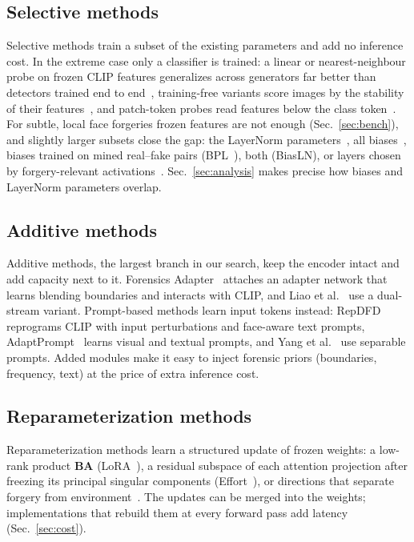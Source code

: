 \documentclass[fonts]{icst}
\begin{document}
\subsection{Selective methods}
Selective methods train a subset of the existing parameters and add no inference cost. In the extreme case only a classifier is trained: a linear or nearest-neighbour probe on frozen CLIP features generalizes across generators far better than detectors trained end to end~\cite{ojha2023universal}, training-free variants score images by the stability of their features~\cite{tsai2024trainingfree}, and patch-token probes read features below the class token~\cite{abdullah2026tap}. For subtle, local face forgeries frozen features are not enough (Sec.~\ref{sec:bench}), and slightly larger subsets close the gap: the LayerNorm parameters~\cite{yermakov2025clip,yermakov2025gend}, all biases~\cite{benzaken2022bitfit}, biases trained on mined real--fake pairs (BPL~\cite{xu2026bpl}), both (BiasLN), or layers chosen by forgery-relevant activations~\cite{zhang2026layermask}. Sec.~\ref{sec:analysis} makes precise how biases and LayerNorm parameters overlap.

\subsection{Additive methods}
Additive methods, the largest branch in our search, keep the encoder intact and add capacity next to it. Forensics Adapter~\cite{cui2025forada} attaches an adapter network that learns blending boundaries and interacts with CLIP, and Liao et al.~\cite{liao2026dfa} use a dual-stream variant. Prompt-based methods learn input tokens instead: RepDFD~\cite{lin2025repdfd} reprograms CLIP with input perturbations and face-aware text prompts, AdaptPrompt~\cite{jiang2026adaptprompt} learns visual and textual prompts, and Yang et al.~\cite{yang2026separable} use separable prompts. Added modules make it easy to inject forensic priors (boundaries, frequency, text) at the price of extra inference cost.

\subsection{Reparameterization methods}
Reparameterization methods learn a structured update of frozen weights: a low-rank product $\mathbf{B}\mathbf{A}$ (LoRA~\cite{hu2022lora}), a residual subspace of each attention projection after freezing its principal singular components (Effort~\cite{yan2025effort}), or directions that separate forgery from environment~\cite{chen2026envsubspace}. The updates can be merged into the weights; implementations that rebuild them at every forward pass add latency (Sec.~\ref{sec:cost}).
\end{document}
